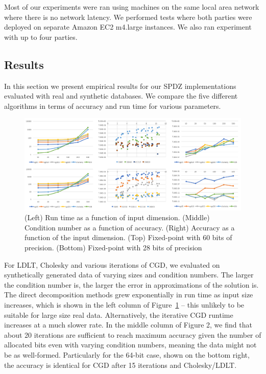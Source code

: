 \documentclass{article}
\begin{document}
Most of our experiments were ran using machines on the same local area network where there is no network latency. We performed tests where both parties were deployed on separate Amazon EC2 m4.large instances.
We also ran experiment with up to four parties.


\subsection{Results}

In this section we present empirical results for our SPDZ implementations evaluated with real and synthetic databases. We compare the five different algorithms in terms of accuracy and run time for various parameters. 

\begin{figure}[h!]
\centering
  \includegraphics[scale=0.4]{allregression.png}
    \caption{(Left) Run time as a function of input dimension. (Middle) Condition number as a function of accuracy. (Right) Accuracy as a function of the input dimension. (Top) Fixed-point with 60 bits of precision. (Bottom) Fixed-point with 28 bits of precision}
   \label{fig:result1}   
\end{figure}

For LDLT, Cholesky and various iterations of CGD, we evaluated on synthetically generated data of varying sizes and condition numbers. The larger the condition number is, the larger the error in approximations of the solution is. The direct decomposition methods grew exponentially in run time as input size increases, which is shown in the left column of Figure~\ref{fig:result1} -- this unlikely to be suitable for large size real data. Alternatively, the iterative CGD runtime increases at a much slower rate. In the middle column of Figure 2, we find that about 20 iterations are sufficient to reach maximum accuracy given the number of allocated bits even with varying condition numbers, meaning the data might not be as well-formed. Particularly for the 64-bit case, shown on the bottom right, the accuracy is identical for CGD after 15 iterations and Cholesky/LDLT.
\end{document}
